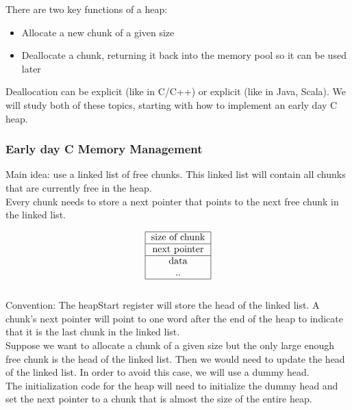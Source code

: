 \documentclass[12pt, letterpaper]{article}
\begin{document}
There are two key functions of a heap:
\begin{itemize}
\item Allocate a new chunk of a given size
\item Deallocate a  chunk, returning it back into the memory pool so it can be used later
\end{itemize}

Deallocation can be explicit (like in C/C++) or explicit (like in Java, Scala). We will study both of these topics, starting with how to implement an early day C heap.

\subsubsection{Early day C Memory Management}
Main idea: use a linked list of free chunks. This linked list will contain all chunks that are currently free in the heap.\\

Every chunk needs to store a next pointer that points to the next free chunk in the linked list.

\[
\begin{tabular}{|c|}
\hline
size of chunk\\
\hline
next pointer\\
\hline
data\\
..\\
\hline
\end{tabular}
\]\\

Convention: The heapStart register will store the head of the linked list. A chunk's next pointer will point to one word after the end of the heap to indicate that it is the last chunk in the linked list.\\

Suppose we want to allocate a chunk of a given size but the only large enough free chunk is the head of the linked list. Then we would need to update the head of the linked list. In order to avoid this case, we will use a dummy head.\\

The initialization code for the heap will need to initialize the dummy head and set the next pointer to a chunk that is almost the size of the entire heap.\\
\end{document}
